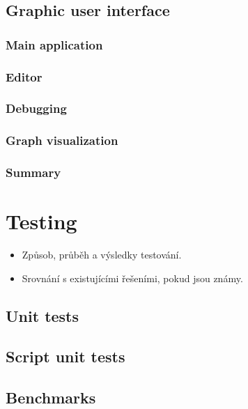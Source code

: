 \documentclass[11pt,twoside,a4paper]{book}
\begin{document}
\section{Graphic user interface}

\subsection{Main application}

\subsection{Editor}

\subsection{Debugging}

\subsection{Graph visualization}

\subsection{Summary}




\chapter{Testing}

\begin{itemize}
 \item Způsob, průběh a výsledky testování.
 \item Srovnání s existujícími řešeními, pokud jsou známy.
\end{itemize}

\section{Unit tests}

\section{Script unit tests}

\section{Benchmarks}
\end{document}
